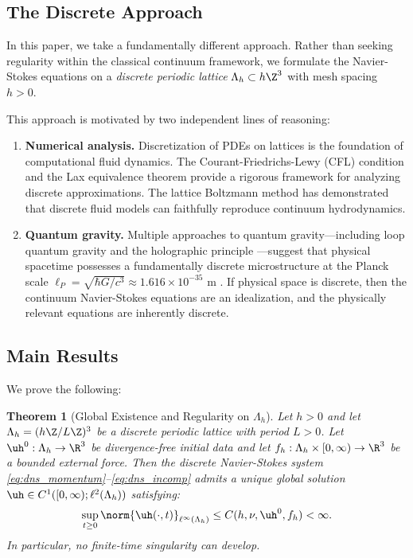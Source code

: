 \documentclass[12pt, a4paper]{article}
\theoremstyle{plain}
\newtheorem{theorem}{Theorem}[section]
\theoremstyle{definition}
\begin{document}
\subsection{The Discrete Approach}

In this paper, we take a fundamentally different approach. Rather than seeking
regularity within the classical continuum framework, we formulate the
Navier-Stokes equations on a \emph{discrete periodic lattice}
$\Lambda_h \subset h\Z^3$ with mesh spacing $h > 0$.

This approach is motivated by two independent lines of reasoning:

\begin{enumerate}[label=(\roman*)]
  \item \textbf{Numerical analysis.} Discretization of PDEs on lattices is the
    foundation of computational fluid dynamics. The Courant-Friedrichs-Lewy (CFL)
    condition \citep{CFL1928} and the Lax equivalence theorem \citep{Lax1954}
    provide a rigorous framework for analyzing discrete approximations. The lattice
    Boltzmann method \citep{Succi2001, GoldsteinHardyPomeranceTaylor1993} has
    demonstrated that discrete fluid models can faithfully reproduce continuum
    hydrodynamics.

  \item \textbf{Quantum gravity.} Multiple approaches to quantum gravity---including
    loop quantum gravity \citep{Rovelli2004} and the holographic principle
    \citep{tHooft1993}---suggest that physical spacetime possesses a
    fundamentally discrete microstructure at the Planck scale
    $\ell_P = \sqrt{\hbar G / c^3} \approx 1.616 \times 10^{-35}$ m
    \citep{Planck1899}. If physical space is discrete, then the continuum
    Navier-Stokes equations are an idealization, and the physically relevant
    equations are inherently discrete.
\end{enumerate}

\subsection{Main Results}

We prove the following:

\begin{theorem}[Global Existence and Regularity on $\Lambda_h$]\label{thm:main}
  Let $h > 0$ and let $\Lambda_h = (h\Z / L\Z)^3$ be a discrete periodic lattice
  with period $L > 0$. Let $\uh^0 : \Lambda_h \to \R^3$ be divergence-free
  initial data and let $f_h : \Lambda_h \times [0,\infty) \to \R^3$ be a
  bounded external force. Then the discrete Navier-Stokes system
  \eqref{eq:dns_momentum}--\eqref{eq:dns_incomp} admits a unique global
  solution $\uh \in C^1([0,\infty); \ell^2(\Lambda_h))$ satisfying:
  \begin{equation}\label{eq:main_bound}
    \sup_{t \geq 0} \norm{\uh(\cdot, t)}_{\ell^\infty(\Lambda_h)} \leq C(h, \nu, \uh^0, f_h) < \infty.
  \end{equation}
  In particular, no finite-time singularity can develop.
\end{theorem}
\end{document}
